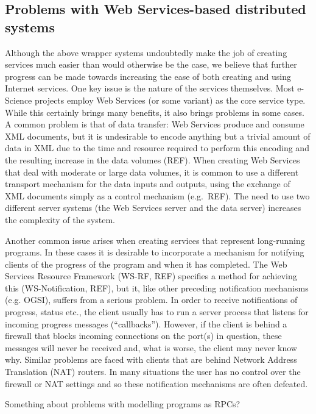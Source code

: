 \documentclass{llncs}
\begin{document}
\subsection{Problems with Web Services-based distributed systems}
Although the above wrapper systems undoubtedly make the job of creating services much easier than would otherwise be the case, we believe that further progress can be made towards increasing the ease of both creating and using Internet services.  One key issue is the nature of the services themselves.  Most e-Science projects employ Web Services (or some variant) as the core service type.  While this certainly brings many benefits, it also brings problems in some cases.  A common problem is that of data transfer: Web Services produce and consume XML documents, but it is undesirable to encode anything but a trivial amount of data in XML due to the time and resource required to perform this encoding and the resulting increase in the data volumes (REF).  When creating Web Services that deal with moderate or large data volumes, it is common to use a different transport mechanism for the data inputs and outputs, using the exchange of XML documents simply as a control mechanism (e.g.\ REF).  The need to use two different server systems (the Web Services server and the data server) increases the complexity of the system.

Another common issue arises when creating services that represent long-running programs.  In these cases it is desirable to incorporate a mechanism for notifying clients of the progress of the program and when it has completed.  The Web Services Resource Framework (WS-RF, REF) specifies a method for achieving this (WS-Notification, REF), but it, like other preceding notification mechanisms (e.g. OGSI), suffers from a serious problem.  In order to receive notifications of progress, status etc., the client usually has to run a server process that listens for incoming progress messages (``callbacks'').  However, if the client is behind a firewall that blocks incoming connections on the port(s) in question, these messages will never be received and, what is worse, the client may never know why.  Similar problems are faced with clients that are behind Network Address Translation (NAT) routers.  In many situations the user has no control over the firewall or NAT settings and so these notification mechanisms are often defeated.

Something about problems with modelling programs as RPCs?
\end{document}
